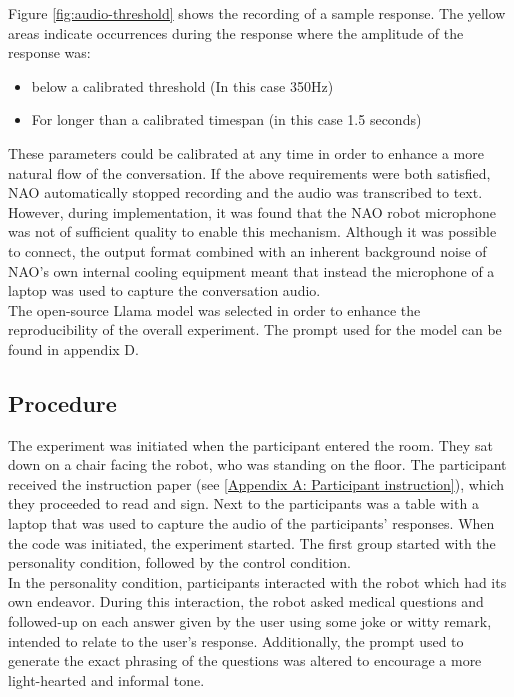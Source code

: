 \documentclass[runningheads]{llncs}
\begin{document}
Figure \ref{fig:audio-threshold} shows the recording of a sample response. The yellow areas indicate occurrences during the response where the amplitude of the response was:
\begin{itemize}
    \item below a calibrated threshold (In this case 350Hz)
    \item For longer than a calibrated timespan (in this case 1.5 seconds)
\end{itemize}
  These parameters could be calibrated at any time in order to enhance a more natural flow of the conversation. If the above requirements were both satisfied, NAO automatically stopped recording and the audio was transcribed to text. However, during implementation, it was found that the NAO robot microphone was not of sufficient quality to enable this mechanism. Although it was possible to connect, the output format combined with an inherent background noise of NAO's own internal cooling equipment meant that instead the microphone of a laptop was used to capture the conversation audio.
\\
The open-source Llama model was selected in order to enhance the reproducibility of the overall experiment. The prompt used for the model can be found in appendix D.

\subsection{Procedure}
The experiment was initiated when the participant entered the room. They sat down on a chair facing the robot, who was standing on the floor. The participant received the instruction paper (see \ref{Appendix A: Participant instruction}), which they proceeded to read and sign. Next to the participants was a table with a laptop that was used to capture the audio of the participants' responses. When the code was initiated, the experiment started. The first group started with the personality condition, followed by the control condition. \\

In the personality condition, participants interacted with the robot which had its own endeavor. During this interaction, the robot asked medical questions and followed-up on each answer given by the user using some joke or witty remark, intended to relate to the user's response. Additionally, the prompt used to generate the exact phrasing of the questions was altered to encourage a more light-hearted and informal tone.\\
\end{document}
